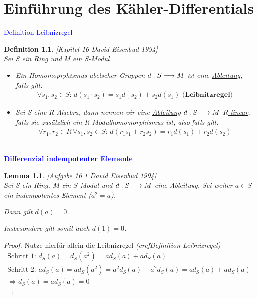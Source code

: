 \documentclass[10pt,a4paper]{report}
\newcommand{\ModulsOfDifferenzials}{David Eisenbud 1994}
\newcounter{Aussage}[chapter]
\newtheorem{lemma}[Aussage]{Lemma}
\newtheorem{definition}[Aussage]{Definition}
\newcommand{\functionfront}[3]{\nolinebreak{#1:#2 \longrightarrow #3}}
\newcommand{\divf}[1]{d_{#1}}
\begin{document}
\chapter{Einführung des Kähler-Differentials}

\textcolor{blue}{Definition Leibnizregel}
\begin{definition}\label{Definition Leibnizregel} \textit{[Kapitel 16 \ModulsOfDifferenzials]}\\
Sei S ein Ring und M ein S-Modul
\begin{itemize}
\item[]Ein Homomoprphismus abelscher Gruppen $\functionfront{d}{S}{M}$ ist eine \underline{Ableitung}, falls gilt:
\begin{gather*}
\forall s_1,s_2 \in S :\, d(s_1 \cdot s_2) = s_1d(s_2) + s_2d(s_1) \textbf{ (Leibnitzregel)}
\end{gather*}
\item[]Sei S eine R-Algebra, dann nennen wir eine \underline{Ableitung} $\functionfront{d}{S}{M}$ \underline{$R$-linear}, falls sie zusätzlich ein R-Modulhomomorphismus ist, also falls gilt:
\begin{gather*}
\forall r_1,r_2 \in R \, \forall s_1,s_2 \in S : \, d(r_1 s_1 + r_2 s_2) = r_1 d(s_1) + r_2 d(s_2)
\end{gather*}
\end{itemize}
\end{definition}


\ \\
\textcolor{blue}{\textbf{Differenzial indempotenter Elemente}}
\begin{lemma}\label{Differenzial indempotenter Elemente} \textit{[Aufgabe 16.1 \ModulsOfDifferenzials]} \\
Sei S ein Ring, $M$ ein $S$-Modul und $\functionfront{d}{S}{M}$ eine Ableitung. Sei weiter $a \in S$ ein indempotentes Element ($a^2 = a$).
\begin{center}
Dann gilt $d(a) = 0$. 
\end{center}
Insbesondere gilt somit auch $d(1) = 0$.
\end{lemma}
\begin{proof}
Nutze hierfür allein die Leibnizregel \textit{(cref{Definition Leibnizregel})}
\begin{gather*}
\text{Schritt 1: } \divf{S}(a) = \divf{S}(a^2) = a\divf{S}(a) + a\divf{S}(a) \\
\text{Schritt 2: } a\divf{S}(a) = a\divf{S}(a^2) = a^2\divf{S}(a) + a^2\divf{S}(a) = a\divf{S}(a) + a\divf{S}(a)\\
\Rightarrow \divf{S}(a) = a\divf{S}(a) = 0
\end{gather*}
\end{proof}
\end{document}
